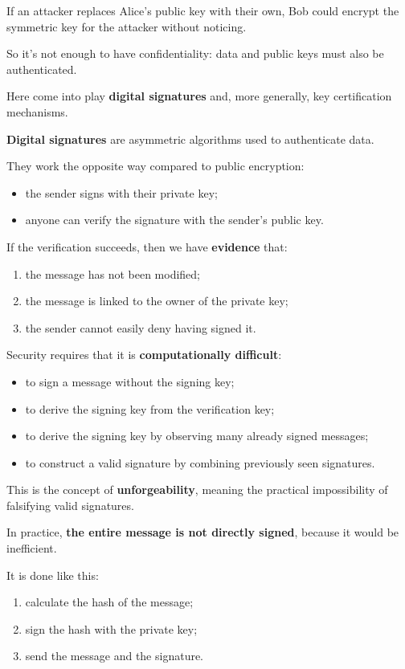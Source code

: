 \documentclass{article}
\begin{document}
If an attacker replaces Alice's public key with their own, Bob could encrypt the symmetric key for the attacker without noticing.

So it's not enough to have confidentiality: data and public keys must also be authenticated.

Here come into play \textbf{digital signatures} and, more generally, key certification mechanisms.

\textbf{Digital signatures} are asymmetric algorithms used to authenticate data.

They work the opposite way compared to public encryption:
\begin{itemize}
\item the sender signs with their private key;
\item anyone can verify the signature with the sender's public key.
\end{itemize}

If the verification succeeds, then we have \textbf{evidence} that:
\begin{enumerate}
\item the message has not been modified;
\item the message is linked to the owner of the private key;
\item the sender cannot easily deny having signed it.
\end{enumerate}

Security requires that it is \textbf{computationally difficult}:
\begin{itemize}
\item to sign a message without the signing key;
\item to derive the signing key from the verification key;
\item to derive the signing key by observing many already signed messages;
\item to construct a valid signature by combining previously seen signatures.
\end{itemize}

This is the concept of \textbf{unforgeability}, meaning the practical impossibility of falsifying valid signatures.

In practice, \textbf{the entire message is not directly signed}, because it would be inefficient.

It is done like this:
\begin{enumerate}
\item calculate the hash of the message;
\item sign the hash with the private key;
\item send the message and the signature.
\end{enumerate}
\end{document}
